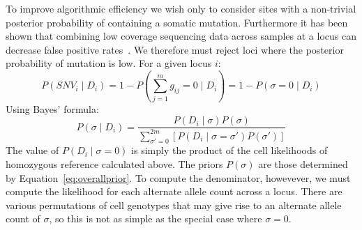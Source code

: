 \documentclass[../../main.tex]{subfiles}
\begin{document}
To improve algorithmic efficiency we wish only to consider sites with a non-trivial posterior probability of containing a somatic mutation. Furthermore it has been shown that combining low coverage sequencing data across samples at a locus can decrease false positive rates~\cite{ledurbin}. We therefore must reject loci where the posterior probability of mutation is low. For a given locus $i$:
\begin{equation}
P(SNV_i\mid D_i) = 1- P\left(\sum_{j=1}^m g_{ij} = 0 \mid D_i\right) = 1-P(\sigma = 0 \mid D_i)
\end{equation}
Using Bayes' formula:
\begin{equation}\label{eq:sitebayes}
P\left(\sigma \mid D_i\right) = \frac{P(D_i\mid \sigma)P(\sigma)}{\sum_{\sigma'=0}^{2m}[P(D_i\mid \sigma=\sigma')P(\sigma')]}
\end{equation}
The value of $P(D_i\mid \sigma = 0)$ is simply the product of the cell likelihoods of homozygous reference calculated above. The priors $P(\sigma)$ are those determined by Equation~\eqref{eq:overallprior}. To compute the denominator, howevever, we must compute the likelihood for each alternate allele count across a locus. There are various permutations of cell genotypes that may give rise to an alternate allele count of $\sigma$, so this is not as simple as the special case where $\sigma=0$.\\
\end{document}
